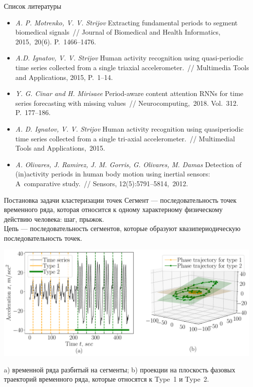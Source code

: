 \documentclass[9pt,pdf,hyperref={unicode}]{beamer}
\begin{document}
\begin{frame}{Список литературы}
	\begin{itemize}
	\justifying
		\item \textit{A. P. Motrenko, V. V. Strijov} Extracting fundamental periods to segment biomedical signals~// Journal of Biomedical and Health Informatics, 2015,~20(6). P.~1466--1476.
		\item \textit{A.D. Ignatov, V. V. Strijov} Human activity recognition using quasi-periodic time series collected from a single triaxial accelerometer.~// Multimedia Tools and Applications, 2015, P.~1--14.

		
		\item \textit{Y. G. Cinar and H. Mirisaee} Period-aware content attention RNNs for time series forecasting with missing values~// Neurocomputing,~2018. Vol.~312. P.~177--186.
		
		\item	\textit{A. D. Ignatov, V. V. Strijov} Human activity recognition using quasiperiodic time series collected from a single tri-axial accelerometer.~// Multimedial Tools and Applications,~2015.
		
		\item \textit{A. Olivares, J. Ramirez, J. M. Gorris, G. Olivares, M. Damas} Detection of (in)activity periods in human body motion using inertial sensors: A~comparative study.~// Sensors, 12(5):5791--5814,~2012.
		
	\end{itemize}
\end{frame}

\begin{frame}{Постановка задачи кластеризации точек}
\justifying
Сегмент --- последовательность точек временного ряда, которая относится к одному характерному физическому действию человека: шаг, прыжок.\\
Цепь --- последовательность сегментов, которые образуют квазипериодическую последовательность точек.

\begin{center}
	\includegraphics[width=1\textwidth]{results/introduction}
\end{center}

a) временной ряда разбитый на сегменты; b) проекции на плоскость фазовых траекторий временного ряда, которые относятся к Type~1 и Type~2.

\end{frame}
\end{document}
